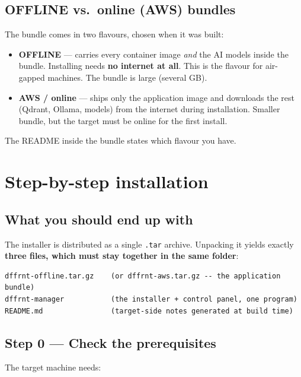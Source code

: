 \documentclass[11pt,letterpaper]{article}
\let\oldsection\section
\renewcommand{\section}{\vspace{1em}\oldsection}
\begin{document}
\subsection{OFFLINE vs.\ online (AWS) bundles}

The bundle comes in two flavours, chosen when it was built:

\begin{itemize}
  \item \textbf{OFFLINE} --- carries every container image \emph{and} the AI
        models inside the bundle. Installing needs \textbf{no internet at
        all}. This is the flavour for air-gapped machines. The bundle is
        large (several GB).
  \item \textbf{AWS / online} --- ships only the application image and
        downloads the rest (Qdrant, Ollama, models) from the internet during
        installation. Smaller bundle, but the target must be online for the
        first install.
\end{itemize}

The README inside the bundle states which flavour you have.

\section{Step-by-step installation}

\subsection{What you should end up with}

The installer is distributed as a single \texttt{.tar} archive. Unpacking it
yields exactly \textbf{three files, which must stay together in the same
folder}:

\begin{lstlisting}
dffrnt-offline.tar.gz    (or dffrnt-aws.tar.gz -- the application bundle)
dffrnt-manager           (the installer + control panel, one program)
README.md                (target-side notes generated at build time)
\end{lstlisting}

\subsection{Step 0 --- Check the prerequisites}

The target machine needs:
\end{document}
